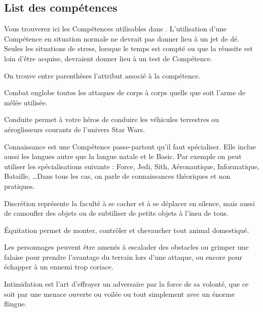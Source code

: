 \subsection{List des compétences}
Vous trouverez ici les Compétences utilisables dans \swr. L’utilisation d’une Compétence en situation normale ne devrait pas donner lieu à un jet de dé. Seules les situations de stress, lorsque le temps est compté ou que la réussite est loin d’être acquise, devraient donner lieu à un test de Compétence.

On trouve entre parenthèses l’attribut associé à la compétence.

\begin{description}[align=left]
    \item [Combat (Agi)]
        Combat englobe toutes les attaques de corps à corps quelle que soit l’arme de mêlée utilisée.

    \item [Conduite (Agi)]
        Conduite permet à votre héros de conduire les véhicules terrestres ou aéroglisseurs courants de l’univers Star Wars.

    \item [Connaissance (Int)]
        Connaissance est une Compétence passe-partout qu’il faut spécialiser. Elle inclue aussi les langues autre que la langue natale et le Basic. Par exemple on peut utiliser les spécialisations suivante : Force, Jedi, Sith, Aéronautique, Informatique, Bataille, \ldots Dans tous les cas, on parle de connaissances théoriques et non pratiques.

    \item [Discrétion (Agi)]
        Discrétion représente la faculté à se cacher et à se déplacer en silence, mais aussi de camoufler des objets ou de subtiliser de petits objets à l’insu de tous.

    \item [\'Equitation (Agi)]
        \'Equitation permet de monter, contrôler et chevaucher tout animal domestiqué.

    \item [Escalade (For)]
        Les personnages peuvent être amenés à escalader des obstacles ou grimper une falaise pour prendre l’avantage du terrain lors d’une attaque, ou encore pour échapper à un ennemi trop coriace.

    \item [Intimidation (\^Ame)]
        Intimidation est l’art d’effrayer un adversaire par la force de sa volonté, que ce soit par une menace ouverte ou voilée ou tout simplement avec un énorme flingue.


\end{description}
